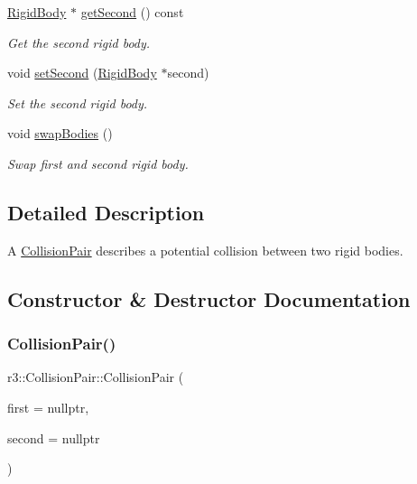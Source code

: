 \begin{DoxyCompactItemize}
\mbox{\hyperlink{classr3_1_1_rigid_body}{Rigid\+Body}} $\ast$ \mbox{\hyperlink{classr3_1_1_collision_pair_a218a4ee7500ed53c3ba5384833afff5a}{get\+Second}} () const
\begin{DoxyCompactList}\small\item\em Get the second rigid body. \end{DoxyCompactList}\item 
void \mbox{\hyperlink{classr3_1_1_collision_pair_acb8c2f4a2c44eeffb8a3d76023db985b}{set\+Second}} (\mbox{\hyperlink{classr3_1_1_rigid_body}{Rigid\+Body}} $\ast$second)
\begin{DoxyCompactList}\small\item\em Set the second rigid body. \end{DoxyCompactList}\item 
void \mbox{\hyperlink{classr3_1_1_collision_pair_a8ef5b5bae7be7db3ed2574ecd9e5bf9a}{swap\+Bodies}} ()
\begin{DoxyCompactList}\small\item\em Swap first and second rigid body. \end{DoxyCompactList}\end{DoxyCompactItemize}


\subsection{Detailed Description}
A \mbox{\hyperlink{classr3_1_1_collision_pair}{Collision\+Pair}} describes a potential collision between two rigid bodies. 

\subsection{Constructor \& Destructor Documentation}
\mbox{\label{classr3_1_1_collision_pair_ab6434bde3aa02c2655e26a976570db01}} 
\subsubsection{\texorpdfstring{Collision\+Pair()}{CollisionPair()}}
{\footnotesize\ttfamily r3\+::\+Collision\+Pair\+::\+Collision\+Pair (\begin{DoxyParamCaption}\item[{\mbox{\hyperlink{classr3_1_1_rigid_body}{Rigid\+Body}} $\ast$}]{first = {\ttfamily nullptr},  }\item[{\mbox{\hyperlink{classr3_1_1_rigid_body}{Rigid\+Body}} $\ast$}]{second = {\ttfamily nullptr} }\end{DoxyParamCaption})\hspace{0.3cm}{\ttfamily [explicit]}}



